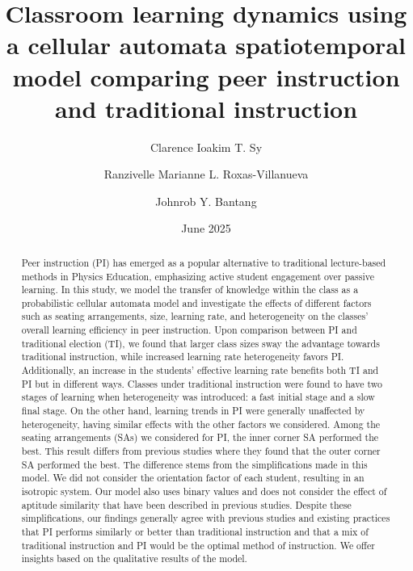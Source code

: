 \documentclass[twocolumn,secnumarabic,amssymb, nobibnotes, aps, prd]{revtex4-2}
\begin{document}
\title{Classroom learning dynamics using a cellular automata spatiotemporal model comparing peer instruction and traditional instruction}%

\author{Clarence Ioakim T. Sy}%
%

\author{Ranzivelle Marianne L. Roxas-Villanueva}%
%

\author{Johnrob Y. Bantang}%
%

\date{June 2025}%

\begin{abstract}

    Peer instruction (PI) has emerged as a popular alternative to traditional lecture-based methods in Physics Education, emphasizing active student engagement over passive learning.
    In this study, we model the transfer of knowledge within the class as a probabilistic cellular automata model and investigate the effects of different factors such as seating arrangements, size, learning rate, and heterogeneity on the classes' overall learning efficiency in peer instruction.
    Upon comparison between PI and traditional election (TI), we found that larger class sizes sway the advantage towards traditional instruction, while increased learning rate heterogeneity favors PI.
    Additionally, an increase in the students' effective learning rate benefits both TI and PI but in different ways.
    Classes under traditional instruction were found to have two stages of learning when heterogeneity was introduced: a fast initial stage and a slow final stage.
    On the other hand, learning trends in PI were generally unaffected by heterogeneity, having similar effects with the other factors we considered.
    Among the seating arrangements (SAs) we considered for PI, the inner corner SA performed the best.
    This result differs from previous studies where they found that the outer corner SA performed the best.
    The difference stems from the simplifications made in this model.
    We did not consider the orientation factor of each student, resulting in an isotropic system.
    Our model also uses binary values and does not consider the effect of aptitude similarity that have been described in previous studies. 
    Despite these simplifications, our findings generally agree with previous studies and existing practices that PI performs similarly or better than traditional instruction and that a mix of traditional instruction and PI would be the optimal method of instruction.
    We offer insights based on the qualitative results of the model.
\end{abstract}
\end{document}
